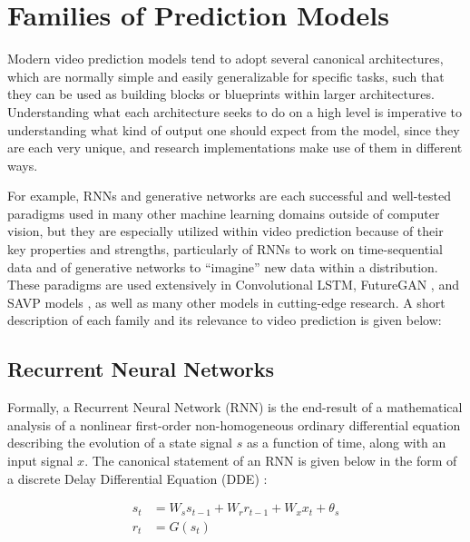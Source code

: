 \documentclass{scrartcl}
\begin{document}
\section{Families of Prediction Models}
\label{sec:families}

Modern video prediction models tend to adopt several canonical architectures,
which are normally simple and easily generalizable for specific tasks, such
that they can be used as building blocks or blueprints within larger
architectures. Understanding what each architecture seeks to do on a high level
is imperative to understanding what kind of output one should expect from the
model, since they are each very unique, and research implementations make use
of them in different ways.

For example, RNNs and generative networks are each successful and well-tested
paradigms used in many other machine learning domains outside of computer
vision, but they are especially utilized within video prediction because of
their key properties and strengths, particularly of RNNs to work on
time-sequential data and of generative networks to ``imagine'' new data within
a distribution. These paradigms are used extensively in Convolutional LSTM,
FutureGAN \cite{futuregan}, and SAVP models \cite{savp}, as well as many other
models in cutting-edge research. A short description of each family and its
relevance to video prediction is given below:

\subsection{Recurrent Neural Networks}
\label{subsec:rnn}

Formally, a Recurrent Neural Network (RNN) is the end-result of a mathematical
analysis of a nonlinear first-order non-homogeneous ordinary differential
equation describing the evolution of a state signal $s$ as a function of time,
along with an input signal $x$. The canonical statement of an RNN is given
below in the form of a discrete Delay Differential Equation (DDE)
\cite{rnn_and_lstm_fundamentals}:

\begin{equation}
	\begin{split}
		s_t & = W_s s_{t - 1} + W_r r_{t - 1} + W_x x_t + \theta_s \\
		r_t & = G ( s_t )
	\end{split}
	\label{eq:rnn_canonical}
\end{equation}
\end{document}
